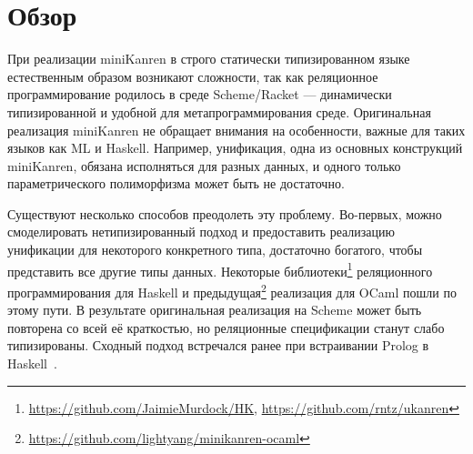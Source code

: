 
\section{Обзор}
\label{sec:relworks}

При реализации miniKanren в строго статически типизированном языке  естественным образом возникают сложности, так как реляционное программирование родилось в среде Scheme/Racket --- динамически типизированной и удобной для метапрограммирования среде.
Оригинальная реализация miniKanren не обращает внимания на особенности, важные для таких языков как ML и Haskell.
Например, унификация, одна из основных конструкций miniKanren, обязана исполняться для разных данных, и одного только параметрического полиморфизма может быть не достаточно.


Существуют несколько способов преодолеть эту проблему.
Во-первых, можно смоделировать нетипизированный подход и предоставить реализацию унификации для некоторого конкретного типа, достаточно богатого, чтобы представить все другие типы данных.
Некоторые библиотеки\footnote{\url{https://github.com/JaimieMurdock/HK}, \url{https://github.com/rntz/ukanren}} реляционного программирования для Haskell и предыдущая\footnote{\url{https://github.com/lightyang/minikanren-ocaml}} реализация для OCaml  пошли по этому пути.
В результате оригинальная реализация на Scheme может быть повторена со всей её краткостью, но реляционные спецификации  станут слабо типизированы.
Сходный подход встречался ранее при встраивании Prolog в  Haskell~\cite{PrologInHaskell}.


